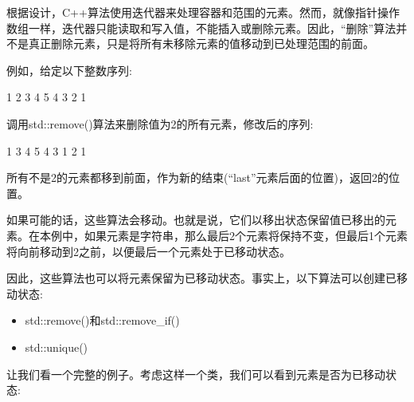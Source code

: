 根据设计，C++算法使用迭代器来处理容器和范围的元素。然而，就像指针操作数组一样，迭代器只能读取和写入值，不能插入或删除元素。因此，“删除”算法并不是真正删除元素，只是将所有未移除元素的值移动到已处理范围的前面。\par

例如，给定以下整数序列:\par

\begin{tcolorbox}[colback=white,colframe=black]
1 2 3 4 5 4 3 2 1
\end{tcolorbox}	

调用std::remove()算法来删除值为2的所有元素，修改后的序列:\par

\begin{tcolorbox}[colback=white,colframe=black]
1 3 4 5 4 3 1 2 1
\end{tcolorbox}	

所有不是2的元素都移到前面，作为新的结束(“last”元素后面的位置)，返回2的位置。\par

如果可能的话，这些算法会移动。也就是说，它们以移出状态保留值已移出的元素。在本例中，如果元素是字符串，那么最后2个元素将保持不变，但最后1个元素将向前移动到2之前，以便最后一个元素处于已移动状态。\par

因此，这些算法也可以将元素保留为已移动状态。事实上，以下算法可以创建已移动状态:\par

\begin{itemize}
	\item std::remove()和std::remove\_if()
	\item std::unique()
\end{itemize}

让我们看一个完整的例子。考虑这样一个类，我们可以看到元素是否为已移动状态:\par

{\color{red}{lib/email.hpp}}\par

